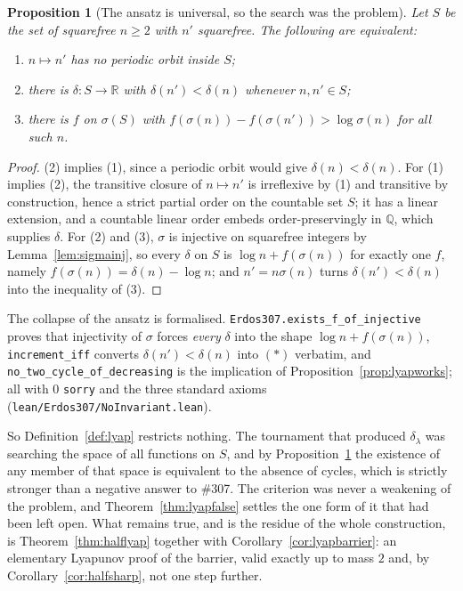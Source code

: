 \documentclass[11pt]{article}
\newtheorem{proposition}[theorem]{Proposition}
\theoremstyle{definition}
\begin{document}
\begin{proposition}[The ansatz is universal, so the search was the problem]\label{prop:lyapuniversal}
Let $S$ be the set of squarefree $n\ge2$ with $n'$ squarefree. The following are equivalent:
\begin{enumerate}[label=\textup{(\arabic*)},leftmargin=2.2em]
\item $n\mapsto n'$ has no periodic orbit inside $S$;
\item there is $\delta:S\to\mathbb{R}$ with $\delta(n')<\delta(n)$ whenever $n,n'\in S$;
\item there is $f$ on $\sigma(S)$ with $f(\sigma(n))-f(\sigma(n'))>\log\sigma(n)$ for all such $n$.
\end{enumerate}
\end{proposition}
\begin{proof}
(2) implies (1), since a periodic orbit would give $\delta(n)<\delta(n)$. For (1) implies (2), the
transitive closure of $n\mapsto n'$ is irreflexive by (1) and transitive by construction, hence a
strict partial order on the countable set $S$; it has a linear extension, and a countable linear
order embeds order-preservingly in $\mathbb{Q}$, which supplies $\delta$. For (2) and (3), $\sigma$
is injective on squarefree integers by Lemma~\ref{lem:sigmainj}, so every $\delta$ on $S$ is
$\log n+f(\sigma(n))$ for exactly one $f$, namely $f(\sigma(n))=\delta(n)-\log n$; and $n'=n\sigma(n)$
turns $\delta(n')<\delta(n)$ into the inequality of (3).
\end{proof}

The collapse of the ansatz is formalised. \texttt{Erdos307.exists\_f\_of\_injective} proves that
injectivity of $\sigma$ forces \emph{every} $\delta$ into the shape $\log n+f(\sigma(n))$,
\texttt{increment\_iff} converts $\delta(n')<\delta(n)$ into $(\ast)$ verbatim, and
\texttt{no\_two\_cycle\_of\_decreasing} is the implication of
Proposition~\ref{prop:lyapworks}; all with $0$ \texttt{sorry} and the three standard axioms
\textup{(\texttt{lean/Erdos307/NoInvariant.lean})}.

So Definition~\ref{def:lyap} restricts nothing. The tournament that produced $\delta_\lambda$ was
searching the space of all functions on $S$, and by Proposition~\ref{prop:lyapuniversal} the
existence of any member of that space is equivalent to the absence of cycles, which is strictly
stronger than a negative answer to \#307. The criterion was never a weakening of the problem, and
Theorem~\ref{thm:lyapfalse} settles the one form of it that had been left open. What remains true,
and is the residue of the whole construction, is Theorem~\ref{thm:halflyap} together with
Corollary~\ref{cor:lyapbarrier}: an elementary Lyapunov proof of the barrier, valid exactly up to
mass $2$ and, by Corollary~\ref{cor:halfsharp}, not one step further.
\end{document}
